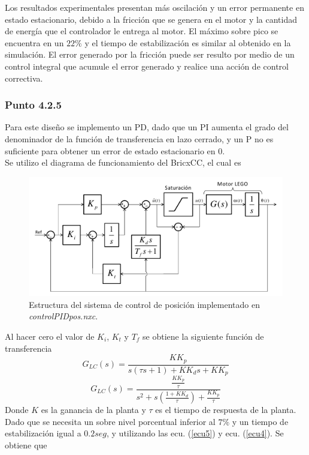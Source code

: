 \documentclass[twocolumn]{IEEEtran}
\begin{document}
\noindent
Los resultados experimentales presentan más oscilación y un error permanente en estado estacionario, debido a la fricción que se genera en el motor y la cantidad de energía que el controlador le entrega al motor. El máximo sobre pico se encuentra en un $22\%$ y el tiempo de estabilización es similar al obtenido en la simulación. El error generado por la fricción puede ser resulto por medio de un control integral que acumule el error  generado y realice una acción de control correctiva.

\subsubsection{Punto 4.2.5}
\noindent
Para este diseño se implemento un PD, dado que un PI aumenta el grado del denominador de la función de transferencia en lazo cerrado, y un P no es suficiente para obtener un error de estado estacionario en 0.\\
Se utilizo el diagrama de funcionamiento del BricxCC, el cual es
\begin{figure}[H]
	\centering
		\includegraphics[scale=0.65]{bricx.png}
	\caption{ Estructura del sistema de control de posición implementado en \textit{controlPIDpos.nxc}.}
	\label{fig11}
\end{figure}
\noindent
Al hacer cero el valor de $K_i$, $K_t$ y $T_f$ se obtiene la siguiente función de transferencia
\begin{equation}
 G_{LC} \left( s \right) = \frac{{KK_p }}{{s\left( {\tau s + 1} \right) + KK_d s + KK_p }}
\label{ecu109}
\end{equation}
\begin{equation}
 G_{LC} \left( s \right) = \frac{{\frac{{KK_p }}{\tau }}}{{s^2  + s\left( {\frac{{1 + KK_d }}{\tau }} \right) + \frac{{KK_p }}{\tau }}}
\label{ecu110}
\end{equation}
\noindent
Donde $K$ es la ganancia de la planta y $\tau$ es el tiempo de respuesta de la planta. Dado que se necesita un sobre nivel porcentual inferior al $7\%$ y un tiempo de estabilización igual a $0.2seg$, y utilizando las ecu. (\ref{ecu5}) y ecu. (\ref{ecu4}). Se obtiene que
\end{document}
